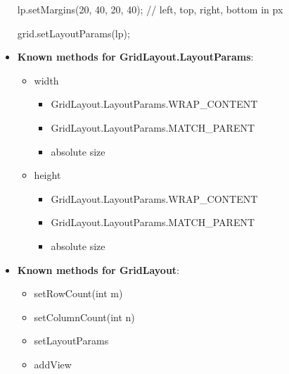 \documentclass{report}
\begin{document}
\begin{itemize}
\begin{javacode}
                lp.setMargins(20, 40, 20, 40); // left, top, right, bottom in px

                grid.setLayoutParams(lp);
            \end{javacode}
        \item \textbf{Known methods for GridLayout.LayoutParams}:
            \begin{itemize}
                \item width 
                    \begin{itemize}
                        \item GridLayout.LayoutParams.WRAP\_CONTENT
                        \item GridLayout.LayoutParams.MATCH\_PARENT
                        \item absolute size
                    \end{itemize}
                \item height 
                    \begin{itemize}
                        \item GridLayout.LayoutParams.WRAP\_CONTENT
                        \item GridLayout.LayoutParams.MATCH\_PARENT
                        \item absolute size
                    \end{itemize}
            \end{itemize}
        \item \textbf{Known methods for GridLayout}:
            \begin{itemize}
                \item setRowCount(int m)
                \item setColumnCount(int n)
                \item setLayoutParams
                \item addView
            \end{itemize}

    \end{itemize}
\end{document}
